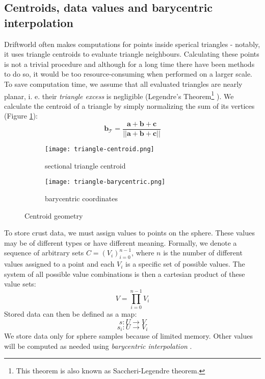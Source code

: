 \subsection{Centroids, data values and barycentric interpolation}
Driftworld often makes computations for points inside sperical triangles - notably, it uses triangle centroids to evaluate triangle neighbours. Calculating these points is not a trivial procedure and although for a long time there have been methods to do so, it would be too resource-consuming when performed on a larger scale. To save computation time, we assume that all evaluated triangles are nearly planar, i. e. their \textit{triangle excess} is negligible (Legendre's Theorem\footnote{This theorem is also known as Saccheri-Legendre theorem.} \cite{todhunter}). We calculate the centroid of a triangle by simply normalizing the sum of its vertices (Figure \ref{fig:triangle-centroid}):
$$\mathbf{b}_\mathcal{T}=\frac{\mathbf{a} + \mathbf{b} + \mathbf{c}}{||\mathbf{a} + \mathbf{b} + \mathbf{c}||}$$
\begin{figure}[ht]
\centering
\begin{subfigure}{7cm}
\texttt{[image: triangle-centroid.png]}
\caption{sectional triangle centroid}
\label{fig:triangle-centroid}
\end{subfigure}
\hspace*{1cm}
\begin{subfigure}{7cm}
\texttt{[image: triangle-barycentric.png]}
\caption{barycentric coordinates}
\label{fig:triangle-barycentric}
\end{subfigure}
\caption{Centroid geometry}
\label{fig:centroid-geometry}
\end{figure}

To store crust data, we must assign values to points on the sphere. These values may be of different types or have different meaning. Formally, we denote a sequence of arbitrary sets $C=\left(V_i\right)_{i=0}^{n-1}$, where $n$ is the number of different values assigned to a point and each $V_i$ is a specific set of possible values. The system of all possible value combinations is then a cartesian product of these value sets:
$$V=\prod_{i=0}^{n-1}V_i$$
Stored data can then be defined as a map:
$$s: U\rightarrow V$$
$$s_i: U\rightarrow V_i$$
We store data only for sphere samples because of limited memory. Other values will be computed as needed using \textit{barycentric interpolation} \cite{scratchapixel}.\newpage

